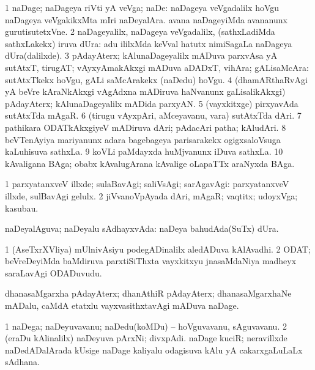 {\bentry
{} 
\gl{\nA}
\expl{}
\bmng
\bnum
\num{1} naDage; naDageya riVti yA veVga; naDe:  naDageya veVgadalilx hoVgu  naDageya veVgakikxMta mIri naDeyalAra.  avana naDageyiMda avananunx gurutisutetxVne. 
\num{2} naDageyalilx, naDageya veVgadalilx, (sathxLadiMda sathxLakekx) iruva dUra:  adu ililxMda keVval hatutx nimiSagaLa naDageya dUra(dalilxde). 
\num{3} pAdayAterx; kAlunaDageyalilx mADuva parxvAsa yA sutAtxT, tirugAT; vAyxyAmakAkxgi mADuva aDADxT, vihAra; gALisaMcAra:  sutAtxTkekx hoVgu, gALi saMcArakekx (naDedu) hoVgu. 
\num{4} (dhamARthaRvAgi yA beVre kAraNkAkxgi vAgAdxna mADiruva haNvanunx gaLisalikAkxgi) pAdayAterx; kAlunaDageyalilx mADida parxyAN. 
\num{5} (vayxkitxge) pirxyavAda sutAtxTda mAgaR. 
\num{6} (tirugu vAyxpAri, aMceyavanu, \mo vara) sutAtxTda dAri. 
\num{7} pathikara ODATkAkxgiyeV mADiruva dAri; pAdacAri patha; kAludAri. 
\num{8} beVTenAyiya mariyanunx adara bagebageya parisarakekx ogigxsaloVsuga kaLuhisuva sathxLa. 
\num{9} koVLi paMdayxda huMjvanunx iDuva sathxLa. 
\num{10} kAvaligana BAga; obabx kAvalugArana kAvalige oLapaTTx araNyxda BAga. 
\enum
\emng

\noindent 
\gl{\pagu}
\expl{}
\bmng
\bnum
\num{1}  parxyatanxveV illxde; sulaBavAgi; saliVsAgi; sarAgavAgi:  parxyatanxveV illxde, sulBavAgi gelulx. 
\num{2}  jiVvanoVpAyada dAri, mAgaR; vaqtitx; udoyxVga; kasubau. 
\enum
\emng
\eentry

\bentry 
{} 
\gl{\gu}
\expl{}
\bmng
naDeyalAguva; naDeyalu sAdhayxvAda:  naDeya bahudAda(SuTx) dUra. 
\emng
\eentry

\bentry
{} 
\gl{\nA}
\expl{}
\bmng
\bnum
\num{1} (AseTxrXVliya) mUlnivAsiyu podegADinalilx aledADuva kAlAvadhi. 
\num{2} ODAT; beVreDeyiMda baMdiruva parxtiSiThxta vayxkitxyu jnasaMdaNiya madheyx saraLavAgi ODADuvudu. 
\enum
\emng
\eentry

\bentry
{} 
\gl{\nA}
\expl{}
\bmng
dhanasaMgarxha pAdayAterx; dhanAthiR pAdayAterx; dhanasaMgarxhaNe mADalu, caMdA etatxlu vayxvasithxtavAgi mADuva naDage. 
\emng
\eentry

\bentry
{} 
\gl{\nA}
\bmng
\bnum
\num{1} naDega; naDeyuvavanu; naDedu(koMDu) -- hoVguvavanu, sAguvavanu. 
\num{2} (eraDu kAlinalilx) naDeyuva pArxNi; divxpAdi. 
\banum
{} naDage kuciR; neravillxde naDedADalArada kUsige naDage kaliyalu odagisuva kAlu yA cakarxgaLuLaLx sAdhana. 
  
\eanum
\numie
\enum
\emng
\eentry

}
